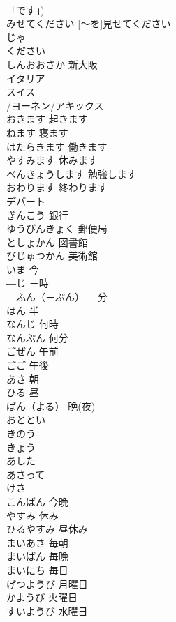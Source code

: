 \documentclass[8pt]{extreport}
\begin{document}
\begin{CJK}{UTF8}{min}
\\	「です」)		
\\	みせてください	[～を]見せてください	
\\	じゃ			
\\	[～を]ください			
\\	しんおおさか	新大阪	
\\	イタリア			
\\	スイス			
\\	/ヨーネン/アキックス			
\\	おきます	起きます	
\\	ねます	寝ます	
\\	はたらきます	働きます	
\\	やすみます	休みます	
\\	べんきょうします	勉強します	
\\	おわります	終わります	
\\	デパート			
\\	ぎんこう	銀行	
\\	ゆうびんきょく	郵便局	
\\	としょかん	図書館	
\\	びじゅつかん	美術館	
\\	いま	今	
\\	―じ	－時	
\\	―ふん（－ぷん）	―分	
\\	はん	半	
\\	なんじ	何時	
\\	なんぷん	何分	
\\	ごぜん	午前	
\\	ごご	午後	
\\	あさ	朝	
\\	ひる	昼	
\\	ばん（よる）	晩(夜)	
\\	おととい			
\\	きのう			
\\	きょう			
\\	あした			
\\	あさって			
\\	けさ			
\\	こんばん	今晩	
\\	やすみ	休み	
\\	ひるやすみ	昼休み	
\\	まいあさ	毎朝	
\\	まいばん	毎晩	
\\	まいにち	毎日	
\\	げつようび	月曜日	
\\	かようび	火曜日	
\\	すいようび	水曜日	

\end{CJK}
\end{document}
